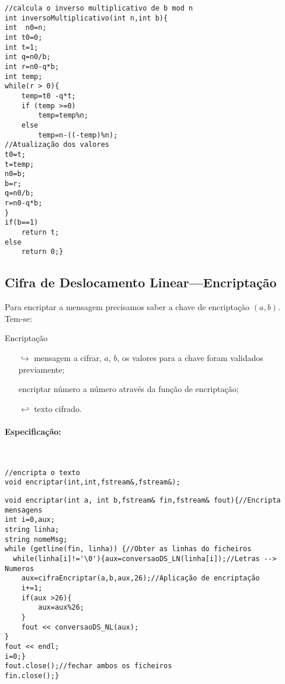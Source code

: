 \begin{lstlisting}[frame=single,mathescape=true,caption={Validação da chave},captionpos=b,label={lst:validacaodaschaves},basicstyle=\footnotesize]
//calcula o inverso multiplicativo de b mod n
int inversoMultiplicativo(int n,int b){
int  n0=n;
int t0=0;
int t=1;
int q=n0/b;
int r=n0-q*b;
int temp;
while(r > 0){
    temp=t0 -q*t;
    if (temp >=0)
        temp=temp%n;
    else
        temp=n-((-temp)%n);
//Atualização dos valores
t0=t;
t=temp;
n0=b;
b=r;
q=n0/b;
r=n0-q*b;
}
if(b==1)
    return t;
else
    return 0;}
\end{lstlisting}
 
\subsection{Cifra de Deslocamento Linear---Encriptação}
\label{sec:cdlEncriptacao}

Para encriptar a mensagem precisamos saber a chave de encriptação $(a,b)$. Tem-se:

Encriptação
\begin{itemize}
    \item[$\hookrightarrow$] mensagem a cifrar, $a$, $b$, os valores para a chave foram validados previamente;
    \item[] encriptar número a número através da função de encriptação;
    \item[$\hookleftarrow$] texto cifrado.
\end{itemize}

\paragraph{Especificação:} {\ }

\begin{lstlisting}[frame=single,mathescape=true,caption={Cifra de Deslocamento Linear---Especificação de \texttt{cifraEncriptar}},captionpos=b,label={lst:DeslocamentoLinearsEncriptar},basicstyle=\footnotesize]
//encripta o texto
void encriptar(int,int,fstream&,fstream&);
\end{lstlisting}
\begin{lstlisting}[frame=single,mathescape=true,caption={Encriptação},captionpos=b,label={lst:Encriptação},basicstyle=\footnotesize]
void encriptar(int a, int b,fstream& fin,fstream& fout){//Encripta mensagens
int i=0,aux;
string linha;
string nomeMsg;
while (getline(fin, linha)) {//Obter as linhas do ficheiros
  while(linha[i]!='\0'){aux=conversaoDS_LN(linha[i]);//Letras --> Numeros
    aux=cifraEncriptar(a,b,aux,26);//Aplicação de encriptação
    i+=1;
    if(aux >26){
        aux=aux%26;
    }
    fout << conversaoDS_NL(aux);
}
fout << endl;
i=0;}
fout.close();//fechar ambos os ficheiros
fin.close();}
\end{lstlisting}

